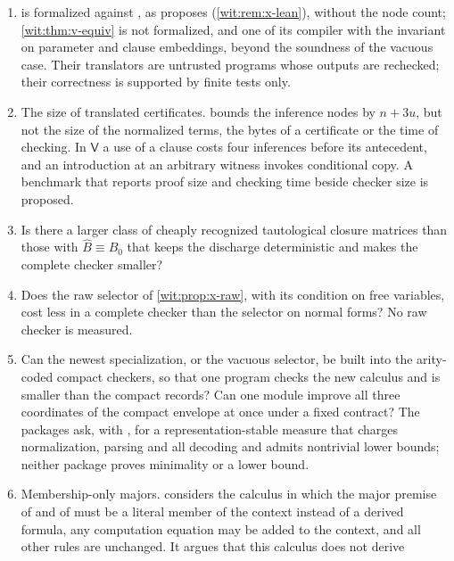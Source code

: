 \begin{question}
\label{wit:q:spec}
\begin{enumerate}[label=\textup{(\roman*)}]
\item {} is formalized against , as
  proposes (\cref{wit:rem:x-lean}), without the
 node count; \cref{wit:thm:v-equiv} is not formalized, and  one of its compiler with
 the invariant on parameter and clause embeddings, beyond the soundness of
 the vacuous case.  Their translators are untrusted programs whose outputs
 are rechecked; their correctness is supported by finite tests only.
\item The size of translated certificates.   bounds
 the inference nodes by $n+3u$, but not the size of the normalized terms,
 the bytes of a certificate or the time of checking.  In $\mathsf V$ a use
 of a clause costs four inferences before its antecedent, and an
 introduction at an arbitrary witness invokes conditional copy.  A benchmark
 that reports proof size and checking time beside checker size is proposed.
\item Is there a larger class of cheaply recognized tautological closure
 matrices than those with $\widehat B\equiv B_0$ that keeps the discharge
 deterministic and makes the complete checker smaller?
\item Does the raw selector of \cref{wit:prop:x-raw}, with its condition on
 free variables, cost less in a complete checker than the selector on normal
 forms?  No raw checker is measured.
\item Can the newest specialization, or the vacuous selector, be built into
 the arity-coded compact checkers, so that one program checks the new
 calculus and is smaller than the compact records?  Can one module improve
 all three coordinates of the compact envelope at once under a fixed
 contract?  The packages ask, with , for a
 representation-stable measure that charges normalization, parsing and all
 decoding and admits nontrivial lower bounds; neither package proves
 minimality or a lower bound.
\item Membership-only majors.   considers the
 calculus in which the major premise of  and of 
 must be a literal member of the context instead of a derived formula, any
 computation equation may be added to the context, and all other rules are
 unchanged.  It argues that this calculus does not derive

\end{enumerate}
\end{question}
